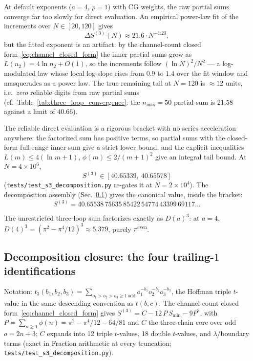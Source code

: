 \documentclass[11pt]{article}
\begin{document}
At default exponents ($a = 4$, $p = 1$) with CG weights, the raw
partial sums converge far too slowly for direct evaluation.  An
empirical power-law fit of the increments over $N \in [20, 120]$ gives
\begin{equation}
  \Delta S^{(3)}(N) \approx 21.6 \cdot N^{-1.23},
  \label{eq:convergence_rate}
\end{equation}
but the fitted exponent is an
artifact: by the channel-count closed
form~\eqref{eq:channel_closed_form} the inner partial sums grow as
$L(n_2) = 4\ln n_2 + O(1)$, so the increments follow
$(\ln N)^2/N^2$ --- a log-modulated law whose local log-slope
rises from $0.9$ to $1.4$ over the fit window and
masquerades as a power law.  The true remaining tail at $N = 120$ is
$\approx 12$ units, i.e.\ \emph{zero} reliable digits from raw partial
sums (cf.\ Table~\ref{tab:three_loop_convergence}: the $n_{\max} = 50$
partial sum is $21.58$ against a limit of $40.66$).

The reliable direct evaluation is a rigorous bracket with no series
acceleration anywhere: the factorized sum has positive terms, so
partial sums with the closed-form full-range inner sum give a strict
lower bound, and the explicit inequalities $L(m) \le 4(\ln m + 1)$,
$\phi(m) \le 2/(m+1)^2$ give an integral tail bound.  At
$N = 4\times10^{6}$,
\begin{equation}
  S^{(3)} \in [40.65339,\ 40.65578]
  \label{eq:s3_bracket}
\end{equation}
(\texttt{tests/test\_s3\_decomposition.py} re-gates it at
$N = 2\times10^{4}$).  The decomposition assembly
(Sec.~\ref{subsec:s3_closure}) gives the canonical value, inside the
bracket:
\begin{equation}
  S^{(3)} = 40.65538\,75635\,85422\,54774\,43399\,69117\ldots
  \label{eq:s3_value}
\end{equation}

The unrestricted three-loop sum factorizes exactly as $D(a)^3$: at
$a = 4$, $D(4)^3 = (\pi^2 - \pi^4/12)^3 \approx 5.379$, purely
$\pi^{\mathrm{even}}$.

\subsection{Decomposition closure: the four trailing-$1$
identifications}
\label{subsec:s3_closure}

Notation: $t_3(b_1,b_2,b_3) = \sum_{o_1>o_2>o_3\ge1\,\mathrm{odd}}
o_1^{-b_1} o_2^{-b_2} o_3^{-b_3}$, the Hoffman triple $t$-value in the
same descending convention as $t(b,c)$.  The channel-count closed
form~\eqref{eq:channel_closed_form} gives
$S^{(3)} = C - 12\,P\,S_{\min} - 9P^3$, with $P = \sum_{n\ge1}\phi(n)
= \pi^2 - \pi^4/12 - 64/81$ and $C$ the three-chain core over odd
$o = 2n+3$; $C$ expands into 12 triple $t$-values, 18 double
$t$-values, and $\lambda$/boundary terms (exact in Fraction arithmetic
at every truncation; \texttt{tests/test\_s3\_decomposition.py}).
\end{document}
